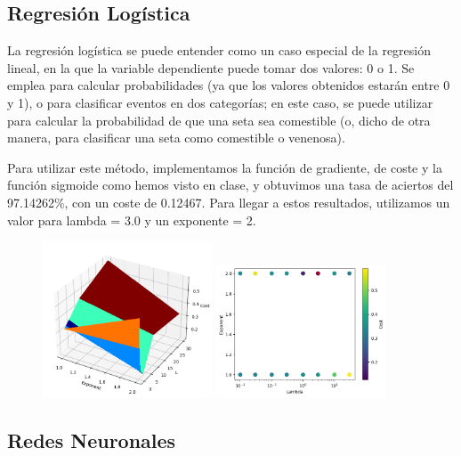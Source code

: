 \documentclass[11pt]{article}
\begin{document}
\subsection {Regresión Logística}

La regresión logística se puede entender como un caso especial de la regresión lineal, en la que la variable dependiente puede tomar dos valores: 0 o 1. Se emplea para calcular probabilidades (ya que los valores obtenidos estarán entre 0 y 1), o para clasificar eventos en dos categorías; en este caso, se puede utilizar para calcular la probabilidad de que una seta sea comestible (o, dicho de otra manera, para clasificar una seta como comestible o venenosa).

Para utilizar este método, implementamos la función de gradiente, de coste y la función sigmoide como hemos visto en clase, y obtuvimos una tasa de aciertos del 97.14262\%, con un coste de 0.12467. Para llegar a estos resultados, utilizamos un valor para lambda = 3.0 y un exponente = 2.

 \begin{figure}[H]
    \begin{center}
    \includegraphics[width=0.45\textwidth]{Results/LogReg/LOG_1.png}
    \includegraphics[width=0.45\textwidth]{Results/LogReg/LOG_2.png}
    \end{center}
 \end{figure}

\subsection{Redes Neuronales}
\end{document}
